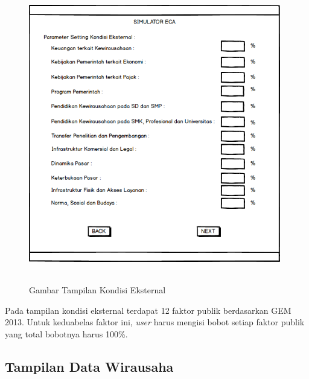 \begin{figure} [H]
	\centering  
	\includegraphics[width=11cm, height=13cm]{mockup3} 
	\caption[Gambar Tampilan Kondisi Eksternal]{Gambar Tampilan Kondisi Eksternal}
	\label{fig:kondisiEksternal} 
\end{figure}

Pada tampilan kondisi eksternal terdapat 12 faktor publik berdasarkan GEM 2013. Untuk keduabelas faktor ini, \textit{user} harus mengisi bobot setiap faktor publik yang total bobotnya harus 100\%. 

\subsection{Tampilan Data Wirausaha}

